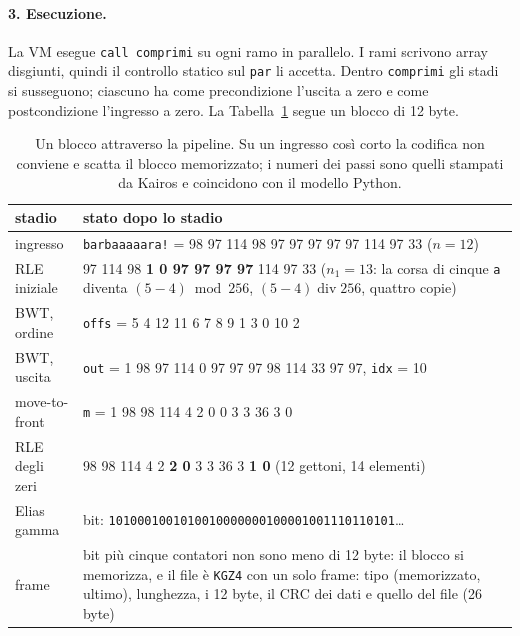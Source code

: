 \documentclass[11pt,a4paper]{article}
\newcommand{\kw}[1]{\texttt{#1}}
\begin{document}
\paragraph{3. Esecuzione.} La VM esegue \kw{call comprimi} su ogni ramo in parallelo. I rami scrivono array disgiunti, quindi il controllo statico sul \kw{par} li accetta. Dentro \kw{comprimi} gli stadi si susseguono; ciascuno ha come precondizione l'uscita a zero e come postcondizione l'ingresso a zero. La Tabella~\ref{tab:esempio} segue un blocco di 12 byte.

\begin{table}[t]
\centering\small
\begin{tabular}{@{}l>{\raggedright\arraybackslash}p{10.6cm}@{}}
\toprule
stadio & stato dopo lo stadio \\
\midrule
ingresso & \kw{barbaaaaara!} = 98 97 114 98 97 97 97 97 97 114 97 33 \quad ($n=12$)\\
RLE iniziale & 98 97 114 98 \textbf{1 0 97 97 97 97} 114 97 33 \quad ($n_1 = 13$: la corsa di cinque \kw{a} diventa $(5-4) \bmod 256$, $(5-4) \operatorname{div} 256$, quattro copie)\\
BWT, ordine & \kw{offs} = 5 4 12 11 6 7 8 9 1 3 0 10 2 \\
BWT, uscita & \kw{out} = 1 98 97 114 0 97 97 97 98 114 33 97 97, \quad \kw{idx} = 10 \\
move-to-front & \kw{m} = 1 98 98 114 4 2 0 0 3 3 36 3 0 \\
RLE degli zeri & 1 98 98 114 4 2 \textbf{2 0} 3 3 36 3 \textbf{1 0} \quad (12 gettoni, 14 elementi) \\
Elias gamma & 84 bit: \kw{1010001001010010000000100001001110110101}\dots \\
frame & 84 bit più cinque contatori non sono meno di 12 byte: il blocco si memorizza, e il file è \kw{KGZ4} con un solo frame: tipo (memorizzato, ultimo), lunghezza, i 12 byte, il CRC dei dati e quello del file (26 byte) \\
\bottomrule
\end{tabular}
\caption{Un blocco attraverso la pipeline. Su un ingresso così corto la codifica non conviene e scatta il blocco memorizzato; i numeri dei passi sono quelli stampati da Kairos e coincidono con il modello Python.}
\label{tab:esempio}
\end{table}
\end{document}
